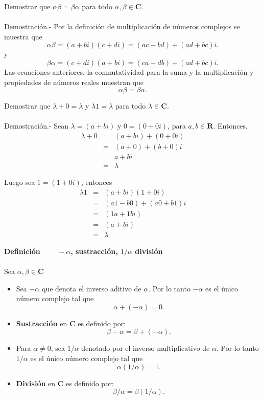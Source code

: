 \begin{myteo}
    Demostrar que $\alpha \beta = \beta \alpha$ para todo $\alpha,\beta \in \textbf{C}$.\\\\
	Demostración.-\; Por la definición de multiplicación de números complejos se muestra que
	$$\alpha \beta = (a+bi)(c+di) = (ac-bd)+(ad+bc)i.$$
	y
	$$\beta \alpha = (c+di)(a+bi) = (ca-db)+(ad+bc)i.$$
	Las ecuaciones anteriores, la conmutatividad para la suma y la multiplicación y propiedades de números reales muestran que $$\alpha\beta = \beta \alpha.$$
\end{myteo}

\begin{ejem}
   Demostrar que $\lambda +0=\lambda $ y $\lambda 1 = \lambda$ para todo $\lambda \in \textbf{C}$.\\\\
	Demostración.-\; Sean $\lambda=(a+bi)$ y $0=(0+0i)$, para $a,b\in \textbf{R}$. Entonces,
		$$\begin{array}{rcl}
		    \lambda +0 & = & (a+bi) + (0+0i)\\
			       & = & (a+0) + (b+0)i\\
			       & = & a + bi\\
			       & = & \lambda
		\end{array}$$

		Luego sea $1=(1+0i)$, entonces
		$$\begin{array}{rcl}
		    \lambda 1 & = & (a+bi)(1+0i)\\
			      & = & (a1-b0)+(a0+b1)i\\
			      & = & (1a + 1bi)\\
			      & = & (a+bi)\\
			      & = & \lambda
		\end{array}$$
\end{ejem}


    \begin{mydef}\textbf{\boldmath Definición $\qquad -\alpha$, sustracción, $1/\alpha$ división}\;\\\\ 
	Sea $\alpha, \beta \in \textbf{C}$
	\begin{itemize}
	    \item Sea $-\alpha$ que denota el inverso aditivo de $\alpha$. Por lo tanto $-\alpha$ es el único número complejo tal que 
		$$\alpha + (-\alpha) = 0.$$

	    \item \textbf{Sustracción} en $\textbf{C}$ es definido por:
		$$\beta - \alpha = \beta + (-\alpha).$$

	    \item Para $\alpha\neq 0$, sea $1/\alpha$ denotado por el inverso multiplicativo de $\alpha$. Por lo tanto $1/\alpha$ es el único número complejo tal que
		$$\alpha (1/\alpha)=1.$$

	    \item \textbf{División} en $\textbf{C}$ es definido por:
		$$\beta/\alpha = \beta(1/\alpha).$$
	\end{itemize}
    \end{mydef}

